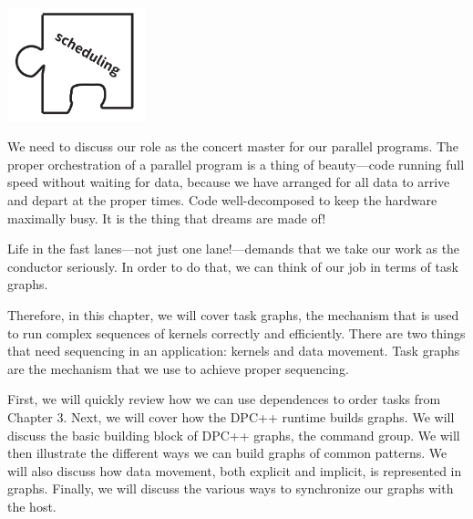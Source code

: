\begin{center}
	\includegraphics[width=0.3\textwidth]{content/chapter-8/images/1}
\end{center}

We need to discuss our role as the concert master for our parallel programs. The proper orchestration of a parallel program is a thing of beauty—code running full speed without waiting for data, because we have arranged for all data to arrive and depart at the proper times. Code well-decomposed to keep the hardware maximally busy. It is the thing that dreams are made of!\par

Life in the fast lanes—not just one lane!—demands that we take our 
work as the conductor seriously. In order to do that, we can think of our job in terms of task graphs.\par

Therefore, in this chapter, we will cover task graphs, the mechanism that is used to run complex sequences of kernels correctly and efficiently. There are two things that need sequencing in an application: kernels and data movement. Task graphs are the mechanism that we use to achieve proper sequencing.\par

First, we will quickly review how we can use dependences to order tasks from Chapter 3. Next, we will cover how the DPC++ runtime builds graphs. We will discuss the basic building block of DPC++ graphs, the command group. We will then illustrate the different ways we can build graphs of common patterns. We will also discuss how data movement, both explicit and implicit, is represented in graphs. Finally, we will discuss the various ways to synchronize our graphs with the host.\par